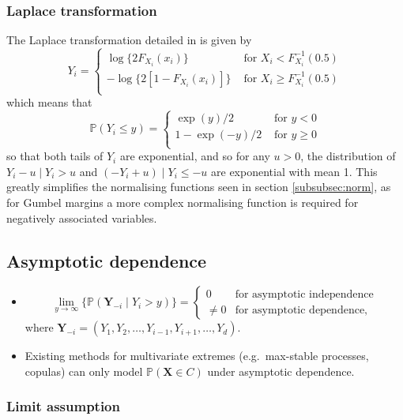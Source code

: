 \documentclass{article}
\numberwithin{equation}{section}
\begin{document}
\subsubsection{Laplace transformation}
The Laplace transformation detailed in \cite{Keef2013} is given by
\[
  Y_i = \begin{cases}
    \log\{2F_{X_i}(x_i)\} &\text{ for } X_i < F_{X_i}^{-1}(0.5) \\
    -\log\{2[1 - F_{X_i}(x_i)]\} &\text{ for } X_i \ge F_{X_i}^{-1}(0.5) \\
  \end{cases}
\]
which means that 
\[
  \mathbb{P}(Y_i \le y) = \begin{cases}
    \exp(y)/2 &\text{ for } y < 0 \\
    1-\exp(-y)/2 &\text{ for } y \ge 0 \\
  \end{cases}
\]
so that both tails of $Y_i$ are exponential, and so for any $u > 0$, the distribution of $Y_i - u \mid Y_i > u$ and $(-Y_i + u) \mid Y_i \le -u$ are exponential with mean 1. 
This greatly simplifies the normalising functions seen in section \ref{subsubsec:norm}, as for Gumbel margins a more complex normalising function is required for negatively associated variables. 

\subsection{Asymptotic dependence}

\begin{itemize}
  \item 
    \[
      \lim_{y \rightarrow \infty}\{\mathbb{P}(\bm{Y}_{-i} \mid Y_i > y)\} = \begin{cases}
      0 &\text{for asymptotic independence} \\
      \ne 0 &\text{for asymptotic dependence}, 
    \end{cases}
    \]
  where $\bm{Y}_{-i} = (Y_1, Y_2, \ldots, Y_{i-1}, Y_{i+1}, \ldots, Y_d)$. 
  \item Existing methods for multivariate extremes (e.g.\ max-stable processes, copulas) can only model $\mathbb{P}(\bm{X} \in C)$ under asymptotic dependence.
\end{itemize}

\subsubsection{Limit assumption}
\end{document}
